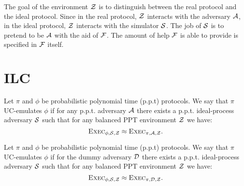 \documentclass[acmsmall,review,anonymous]{acmart}\settopmatter{printfolios=true,printccs=false,printacmref=false}
\begin{document}
The goal of the environment $\mathcal{Z}$ is to distinguish between the real protocol
and the ideal protocol. Since in the real protocol, $\mathcal{Z}$ interacts with the
adversary $\mathcal{A}$, in the ideal protocol, $\mathcal{Z}$ interacts with the simulator
$\mathcal{S}$. The job of $\mathcal{S}$ is to pretend to be $\mathcal{A}$ with the aid of
$\mathcal{F}$. The amount of help $\mathcal{F}$ is able to provide is specified in
$\mathcal{F}$ itself.

\section{ILC}\label{sec:ilc}

\begin{definition}
Let $\pi$ and $\phi$ be probabilistic polynomial time (p.p.t) protocols. We say
that $\pi$ UC-emulates $\phi$ if for any p.p.t. adversary $\mathcal{A}$ there exists a
p.p.t. ideal-process adversary $\mathcal{S}$ such that for any balanced PPT environment
$\mathcal{Z}$ we have:
\begin{equation*}
\textsc{Exec}_{\phi, \mathcal{S}, \mathcal{Z}} \approx \textsc{Exec}_{\pi, \mathcal{A}, \mathcal{Z}}.
\end{equation*}
\end{definition}

\begin{definition}
Let $\pi$ and $\phi$ be probabilistic polynomial time (p.p.t) protocols. We say
that $\pi$ UC-emulates $\phi$ if for the dummy adversary $\mathcal{D}$ there exists a
p.p.t. ideal-process adversary $\mathcal{S}$ such that for any balanced PPT environment
$\mathcal{Z}$ we have:
\begin{equation*}
\textsc{Exec}_{\phi, \mathcal{S}, \mathcal{Z}} \approx \textsc{Exec}_{\pi, \mathcal{D}, \mathcal{Z}}.
\end{equation*}
\end{definition}

\begin{comment}
Let {\sf Bit} be the type of single bits (i.e., 0 or 1), and let {\sf Inf} be
the type of infinite bitstrings. The meaning of an ILC term $\tau$ is given by the
denotation $[\![\tau]\!]\sigma$, which returns, for an infinite bitstring $\sigma{:}{\sf Inf}$, a value
$v{:}{\sf Bit}$. The denotation $[\![\tau]\!]$, then, returns a binary
distribution $d$ over the types of return values for all infinite
bitstrings. Let $\Delta(d_1, d_2)$ denote the statistical distance between two
distributions $d_1$ and $d_2$.


\begin{definition}[$\epsilon$-indistinguishability of ILC Terms]
Let $\tau_1$ and $\tau_2$ be ILC terms, which are closed except for an infinite
bitstream free variable $\sigma{:}{\sf Inf}$. Additionally, for any such $\sigma$,
$[\![t_1]\!]\sigma{:}{\sf Bit}$ and $[\![\tau_2]\!]\sigma{:}{\sf Bit}$. We say that $\tau_1$ and
$\tau_2$ are $\epsilon$-indistinguishable iff $\Delta([\![\tau_1]\!], [\![\tau_2]\!]) \leq \epsilon$.
\end{definition}
\end{comment}
\end{document}
